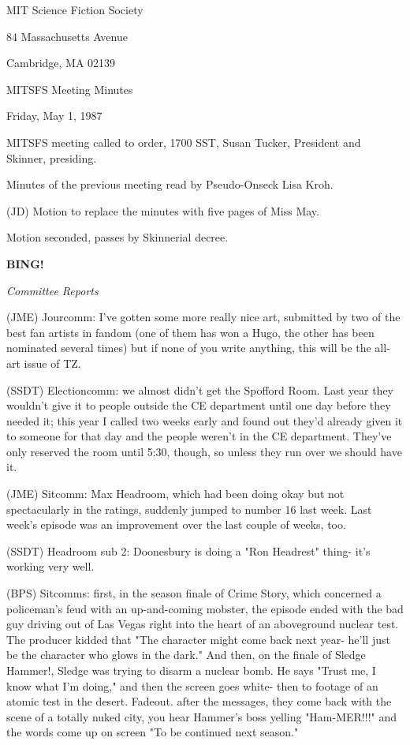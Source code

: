 \documentclass[12pt]{article}
\newcommand{\bing}{{\bf BING!} }
\newcommand{\goto}[1]{\bing \vskip 12pt \centerline{{\em{#1}}}}
\begin{document}
\begin{center}

MIT Science Fiction Society 

84 Massachusetts Avenue

Cambridge, MA 02139

\vspace{12pt}

MITSFS Meeting Minutes 

Friday, May 1, 1987

\end{center}
 
\vspace{18pt}

\setlength{\parskip}{6pt}

\noindent
MITSFS meeting called to order, 1700 SST,
Susan Tucker, President and Skinner, presiding.

Minutes of the previous meeting read by Pseudo-Onseck Lisa Kroh.

(JD) Motion to replace the minutes with five pages of Miss May.

Motion seconded, passes by Skinnerial decree.

\goto{Committee Reports}

(JME) Jourcomm: I've gotten some more really nice art, submitted by two of the best fan artists in fandom (one of them has won a Hugo, the other has been nominated several times) but if none of you write anything, this will be the all-art issue of TZ.

(SSDT) Electioncomm: we almost didn't get the Spofford Room. Last year they wouldn't give it to people outside the CE department until one day before they needed it; this year I called two weeks early and found out they'd already given it to someone for that day and the people weren't in the CE department. They've only reserved the room until 5:30, though, so unless they run over we should have it.

(JME) Sitcomm: Max Headroom, which had been doing okay but not spectacularly in the ratings, suddenly jumped to number 16 last week. Last week's episode was an improvement over the last couple of weeks, too.

(SSDT) Headroom sub 2: Doonesbury is doing a "Ron Headrest" thing- it's working very well.

(BPS) Sitcomms: first, in the season finale of Crime Story, which concerned a policeman's feud with an up-and-coming mobster, the episode ended with the bad guy driving out of Las Vegas right into the heart of an aboveground nuclear test. The producer kidded that "The character might come back next year- he'll just be the character who glows in the dark." And then, on the finale of Sledge Hammer!, Sledge was trying to disarm a nuclear bomb. He says "Trust me, I know what I'm doing," and then the screen goes white- then to footage of an atomic test in the desert. Fadeout. after the messages, they come back with the scene of a totally nuked city, you hear Hammer's boss yelling "Ham-MER!!!" and the words come up on screen "To be continued next season."
\end{document}

